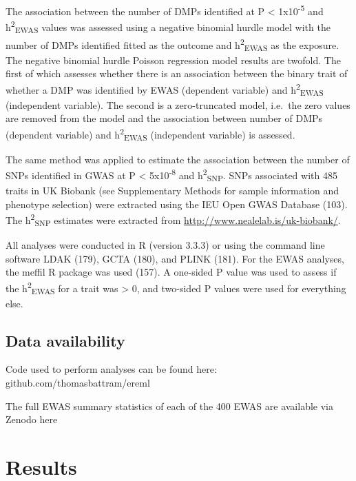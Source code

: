 \documentclass[11pt,oneside]{bristolthesis}
\begin{document}
The association between the number of DMPs identified at P \textless{} 1x10\textsuperscript{-5} and h\textsuperscript{2}\textsubscript{EWAS} values was assessed using a negative binomial hurdle model with the number of DMPs identified fitted as the outcome and h\textsuperscript{2}\textsubscript{EWAS} as the exposure. The negative binomial hurdle Poisson regression model results are twofold. The first of which assesses whether there is an association between the binary trait of whether a DMP was identified by EWAS (dependent variable) and h\textsuperscript{2}\textsubscript{EWAS} (independent variable). The second is a zero-truncated model, i.e.~the zero values are removed from the model and the association between number of DMPs (dependent variable) and h\textsuperscript{2}\textsubscript{EWAS} (independent variable) is assessed.

The same method was applied to estimate the association between the number of SNPs identified in GWAS at P \textless{} 5x10\textsuperscript{-8} and h\textsuperscript{2}\textsubscript{SNP}. SNPs associated with 485 traits in UK Biobank (see Supplementary Methods for sample information and phenotype selection) were extracted using the IEU Open GWAS Database (103). The h\textsuperscript{2}\textsubscript{SNP} estimates were extracted from \url{http://www.nealelab.is/uk-biobank/}.

All analyses were conducted in R (version 3.3.3) or using the command line software LDAK (179), GCTA (180), and PLINK (181). For the EWAS analyses, the meffil R package was used (157). A one-sided P value was used to assess if the h\textsuperscript{2}\textsubscript{EWAS} for a trait was \textgreater{} 0, and two-sided P values were used for everything else.

\hypertarget{data-availability-05}{%
\subsection{Data availability}\label{data-availability-05}}

Code used to perform analyses can be found here: github.com/thomasbattram/ereml

The full EWAS summary statistics of each of the 400 EWAS are available via Zenodo here

\hypertarget{results-05}{%
\section{Results}\label{results-05}}
\end{document}
